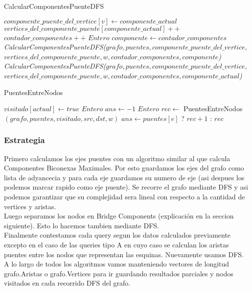 \begin{algorithm}[]
    \caption{CalcularComponentesPuenteDFS}
    $componente\_puente\_del\_vertice[v] \gets componente\_actual$ \;
    $vertices\_del\_componente\_puente[componente\_actual]++$ \;
     {
    	 {
			 {
				$contador\_componentes++$ \;
				$Entero$ $componente \gets contador\_componentes$ \;
				\emph{CalcularComponentesPuenteDFS($grafo, puentes, componente\_puente\_del\_vertice,$ 
				$vertices\_del\_componente\_puente, w, contador\_componentes, componente$)} \;
			}{
				\emph{CalcularComponentesPuenteDFS($grafo, puentes, componente\_puente\_del\_vertice,$ 
				$vertices\_del\_componente\_puente, w, contador\_componentes, componente\_actual$)}
			}
		}
    }
\end{algorithm}

\begin{algorithm}[H]
    \caption{PuentesEntreNodos}
    $visitado[actual] \gets true$ \;
     {
    }
    $Entero$ $ans \gets -1$ \;
     {
    	 {
			$Entero$ $rec \gets$ PuentesEntreNodos$(grafo, puentes, visitado, src, dst, w)$ \;
			 {
				$ans \gets puentes[e]$ ? $rec+1$ : $rec$
			}
		}
    }
\end{algorithm}

\subsubsection*{Estrategia}

Primero calculamos los ejes puentes con un algoritmo similar al que calcula Componentes Biconexas Maximales. Por esto
guardamos los ejes del grafo como lista de adyancecia y para cada eje guardamos su numero de eje (asi despues los podemos
marcar rapido como eje puente). Se recorre el grafo mediante DFS y asi podemos garantizar que su complejidad sera lineal 
con respecto a la cantidad de vertices y aristas. \\
Luego separamos los nodos en Bridge Components (explicación en la seccion siguiente). Esto lo hacemos tambien mediante DFS. \\
Finalmente contestamos cada query segun los datos calculados previamente excepto en el caso de las queries tipo A en cuyo caso 
se calculan los aristas puentes entre los nodos que representan las esquinas. Nuevamente usamos DFS. \\
A lo largo de todos los algoritmos vamos manteniendo vectores de longitud grafo.Aristas o grafo.Vertices para ir guardando resultados
parciales y nodos visitados en cada recorrido DFS del grafo. \\

